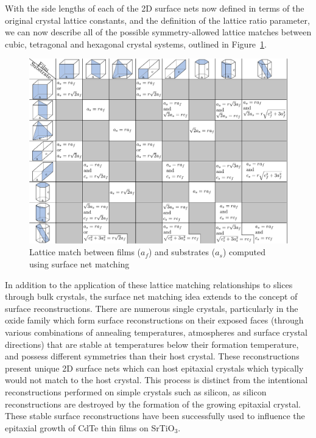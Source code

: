 \documentclass[final,5p,times,twocolumn]{elsarticle}
\begin{document}
With the side lengths of each of the 2D surface nets now defined in terms of the original crystal lattice constants, and the definition of the lattice ratio parameter, we can now describe all of the possible symmetry-allowed lattice matches between cubic, tetragonal and hexagonal crystal systems, outlined in Figure~\ref{fig:match_matrix}.
\begin{figure}
    \includegraphics[width=\textwidth]{graphics/grid2.pdf}
    \caption{Lattice match between films ($a_f$) and substrates ($a_s$) computed using surface net matching\label{fig:match_matrix}}
\end{figure}

In addition to the application of these lattice matching relationships to slices through bulk crystals, the surface net matching idea extends to the concept of surface reconstructions. There are numerous single crystals, particularly in the oxide family which form surface reconstructions on their exposed faces (through various combinations of annealing temperatures, atmospheres and surface crystal directions) that are stable at temperatures below their formation temperature, and possess different symmetries than their host crystal. These reconstructions present unique 2D surface nets which can host epitaxial crystals which typically would not match to the host crystal. This process is distinct from the intentional reconstructions performed on simple crystals such as silicon, as silicon reconstructions are destroyed by the formation of the growing epitaxial crystal. These stable surface reconstructions have been successfully used to influence the epitaxial growth of CdTe thin films on SrTiO$_3$\cite{Neretina2009a}.
\end{document}
